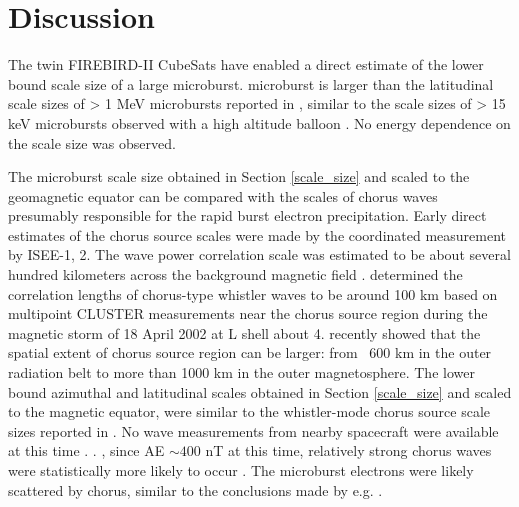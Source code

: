 \documentclass[draft, linenumbers]{agujournal}
\begin{document}
\section{Discussion} \label{discussion}
The twin FIREBIRD-II CubeSats have enabled a direct estimate of the lower bound scale size of a large microburst.  microburst  is larger than the latitudinal scale sizes of > 1 MeV microbursts reported in \citet{Blake1996},  similar to the scale sizes of > 15 keV microbursts observed with a high altitude balloon \citep{Parks1967}  . No energy dependence on the scale size was observed.

The microburst scale size obtained in Section \ref{scale_size} and scaled to the geomagnetic equator can be compared with the scales of chorus waves presumably responsible for the rapid burst electron precipitation. Early direct estimates of the chorus source scales were made by the coordinated measurement by ISEE-1, 2. The wave power correlation scale was estimated to be about several hundred kilometers across the background magnetic field \citep{Gurnett1979}. \citet{Santolik2003} determined the correlation lengths of chorus-type whistler waves to be around 100 km based on multipoint CLUSTER  measurements near the chorus source region during the magnetic storm of 18 April 2002 at L shell about 4. \citet{Agapitov2010, Agapitov2011b, Agapitov2017a} recently showed that the spatial extent of chorus source region can be larger: from ~600 km in the outer radiation belt to more than 1000 km in the outer magnetosphere. The lower bound azimuthal and latitudinal scales obtained in Section \ref{scale_size} and scaled to the magnetic equator, were similar to the whistler-mode chorus source scale sizes reported in \citet{Agapitov2011b, Agapitov2017a}. No wave measurements from nearby spacecraft were available at this time . . , since AE $\sim 400$ nT at this time, relatively strong chorus waves were statistically more likely to occur \citep{Li2009}. The microburst electrons were likely scattered by chorus, similar to the conclusions made by e.g. \citet{Lorentzen2001a, O'Brien2003, Breneman2017}.
\end{document}
